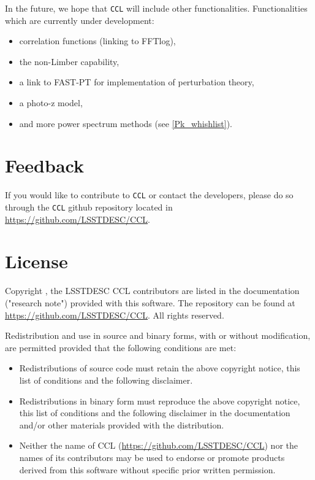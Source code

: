 \documentclass[\docopts]{\docclass}
\begin{document}
In the future, we hope that {\tt CCL} will include other functionalities. Functionalities which are currently under development:
\begin{itemize}
	\item correlation functions (linking to FFTlog),
	\item the non-Limber capability,
	\item a link to FAST-PT \citep{FASTPT} for implementation of perturbation theory,
	\item a photo-z model,
	\item and more power spectrum methods (see \ref{Pk_whishlist}).
\end{itemize}

\section{Feedback}
\label{sec:feedback}

If you would like to contribute to {\tt CCL} or contact the developers, please do so through the {\tt CCL} github repository located in \url{https://github.com/LSSTDESC/CCL}.

\section{License}
\label{sec:license}

Copyright , the LSSTDESC CCL contributors are listed in the
documentation ("research note") provided with this software. The repository can be found at \url{https://github.com/LSSTDESC/CCL}. All rights reserved.

Redistribution and use in source and binary forms, with or without
modification, are permitted provided that the following conditions are met:

\begin{itemize}
\item Redistributions of source code must retain the above copyright notice, this
  list of conditions and the following disclaimer.
\item Redistributions in binary form must reproduce the above copyright notice,
  this list of conditions and the following disclaimer in the documentation
  and/or other materials provided with the distribution.
\item Neither the name of CCL (\url{https://github.com/LSSTDESC/CCL}) nor the names of its
  contributors may be used to endorse or promote products derived from
  this software without specific prior written permission.
\end{itemize}
\end{document}
